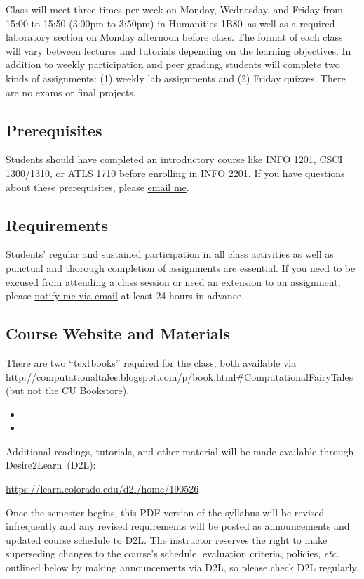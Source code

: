 \documentclass[10pt]{memoir}
\def\myclassroom{Humanities 1B80}
\begin{document}
Class will meet three times per week on Monday, Wednesday, and Friday from 15:00 to 15:50 (3:00pm to 3:50pm) in \myclassroom~as well as a required laboratory section on Monday afternoon before class. The format of each class will vary between lectures and tutorials depending on the learning objectives. In addition to weekly participation and peer grading, students will complete two kinds of assignments: (1) weekly lab assignments and (2) Friday quizzes. There are no exams or final projects.

\subsection{Prerequisites}
Students should have completed an introductory course like INFO 1201, CSCI 1300/1310, or ATLS 1710 before enrolling in INFO 2201. If you have questions about these prerequisites, please \href{mailto:brian.keegan@colorado.edu}{email me}.

\subsection{Requirements}
Students' regular and sustained participation in all class activities as well as punctual and thorough completion of assignments are essential. If you need to be excused from attending a class session or need an extension to an assignment, please \href{mailto:brian.keegan@colorado.edu}{notify me via email} at least 24 hours in advance.

\subsection{Course Website and Materials}
There are two ``textbooks'' required for the class, both available via \url{http://computationaltales.blogspot.com/p/book.html#ComputationalFairyTales} (but not the CU Bookstore).

\begin{itemize}[itemsep=0em]
    \item {}
    \item {}
\end{itemize}

Additional readings, tutorials, and other material will be made available through \mbox{Desire2Learn}~(D2L):
\vspace{-8pt}
    \begin{center}
    \Large{\href{https://learn.colorado.edu/d2l/home/190526}{https://learn.colorado.edu/d2l/home/190526}}
    \end{center}
\vspace{-8pt}
Once the semester begins, this PDF version of the syllabus will be revised infrequently and any revised requirements will be posted as announcements and updated course schedule to D2L. The instructor reserves the right to make superseding changes to the course's schedule, evaluation criteria, policies, \textit{etc.} outlined below by making announcements via D2L, so please check D2L regularly.
\end{document}
